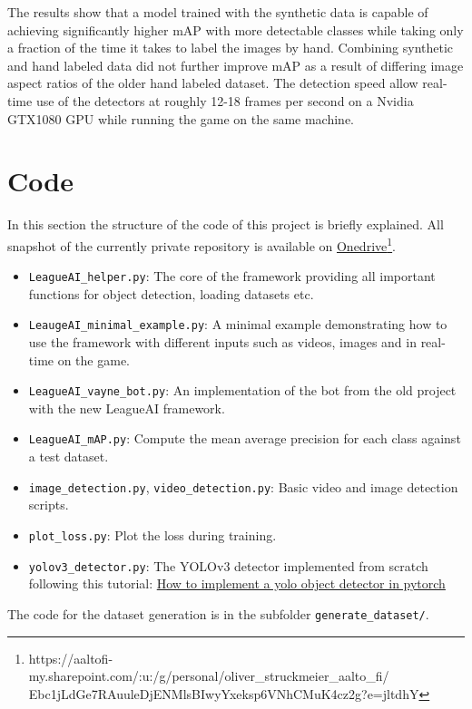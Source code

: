 The results show that a model trained with the synthetic data is capable of achieving significantly higher mAP with more detectable classes while taking only a fraction of the time it takes to label the images by hand.
Combining synthetic and hand labeled data did not further improve mAP as a result of differing image aspect ratios of the older hand labeled dataset.
The detection speed allow real-time use of the detectors at roughly 12-18 frames per second on a Nvidia GTX1080 GPU while running the game on the same machine.

\section{Code}
In this section the structure of the code of this project is briefly explained.
All snapshot of the currently private repository is available on \href{https://aaltofi-my.sharepoint.com/:u:/g/personal/oliver_struckmeier_aalto_fi/Ebc1jLdGe7RAuuleDjENMlsBIwyYxeksp6VNhCMuK4cz2g?e=jltdhY}{Onedrive}\footnote{https://aaltofi-my.sharepoint.com/:u:/g/personal/oliver\_struckmeier\_aalto\_fi/\\Ebc1jLdGe7RAuuleDjENMlsBIwyYxeksp6VNhCMuK4cz2g?e=jltdhY}.
\begin{itemize}
\item \texttt{LeagueAI\_helper.py}: The core of the framework providing all important functions for object detection, loading datasets etc.
\item \texttt{LeaugeAI\_minimal\_example.py}: A minimal example demonstrating how to use the framework with different inputs such as videos, images and in real-time on the game.
\item \texttt{LeagueAI\_vayne\_bot.py}: An implementation of the bot from the old project with the new LeagueAI framework.
\item \texttt{LeagueAI\_mAP.py}: Compute the mean average precision for each class against a test dataset.
\item \texttt{image\_detection.py}, \texttt{video\_detection.py}: Basic video and image detection scripts.
\item \texttt{plot\_loss.py}: Plot the loss during training.
\item \texttt{yolov3\_detector.py}: The YOLOv3 detector implemented from scratch following this tutorial: \href{https://blog.paperspace.com/how-to-implement-a-yolo-object-detector-in-pytorch}{How to implement a yolo object detector in pytorch}
\end{itemize}
The code for the dataset generation is in the subfolder \texttt{generate\_dataset/}.
